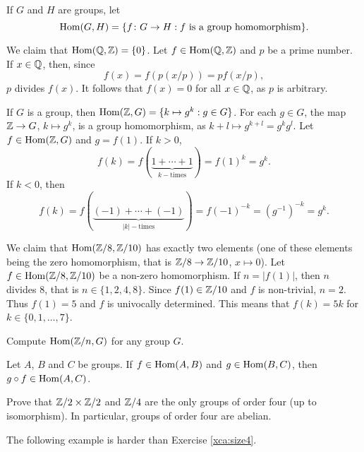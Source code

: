 If $G$ and $H$ are groups, let 
\[
\operatorname{Hom}(G,H)=\{f\colon G\to H:f\text{ is a group homomorphism}\}.
\]

\begin{example}
We claim that 
$\operatorname{Hom}(\mathbb{Q},\mathbb{Z})=\{0\}$. Let $f\in\operatorname{Hom}(\mathbb{Q},\mathbb{Z})$ and $p$ be a prime number. 
If $x\in\mathbb{Q}$, then, since 
\[
f(x)=f\left(p(x/p)\right)=pf(x/p),
\]
$p$ divides $f(x)$. It follows that $f(x)=0$ for all
$x\in\mathbb{Q}$, as $p$ is arbitrary. 
\end{example}

\begin{example}
If $G$ is a group, then $\operatorname{Hom}(\mathbb{Z},G)=\{k\mapsto g^k:g\in G\}$.
For each $g\in G$, the map $\mathbb{Z}\to G$, $k\mapsto g^k$, is a group
homomorphism, as 
$k+l\mapsto g^{k+l}=g^kg^l$. Let $f\in\operatorname{Hom}(\mathbb{Z},G)$ and  $g=f(1)$. If $k>0$,
\[
f(k)=f(\underbrace{1+\cdots+1}_{k-\text{times}})=f(1)^k=g^k.
\]
If $k<0$, then
\[
f(k)=f(\underbrace{(-1)+\cdots+(-1)}_{|k|-\text{times}})=f(-1)^{-k}=(g^{-1})^{-k}=g^k.
\]
\end{example}

\begin{example}
We claim that $\operatorname{Hom}(\mathbb{Z}/8,\mathbb{Z}/10)$ has exactly two elements (one of these elements being 
the zero homomorphism, that is $\mathbb{Z}/8\to\mathbb{Z}/10$, $x\mapsto 0$).
Let $f\in\operatorname{Hom}(\mathbb{Z}/8,\mathbb{Z}/10)$ be a non-zero homomorphism. 
If 
$n=|f(1)|$, then 
$n$ divides $8$, that is $n\in\{1,2,4,8\}$. Since $f(1)\in\mathbb{Z}/10$ and
$f$ is non-trivial,
$n=2$. Thus $f(1)=5$ and $f$ is univocally determined. 
This means that 
$f(k)=5k$ for $k\in\{0,1,\dots,7\}$.
\end{example}

\begin{exercise}
Compute $\operatorname{Hom}(\mathbb{Z}/n,G)$ for any group $G$.
\end{exercise}

\begin{exercise}
Let $A$, $B$ and $C$ be groups. If $f\in\operatorname{Hom}(A,B)$ and $g\in\operatorname{Hom}(B,C)$,
then $g\circ f\in\operatorname{Hom}(A,C)$.
\end{exercise}

\begin{exercise}
\label{xca:size4}
Prove that $\mathbb{Z}/2\times\mathbb{Z}/2$ and $\mathbb{Z}/4$ are 
the only groups of order four (up to isomorphism). In particular, 
groups of order four are abelian. 
\end{exercise}

The following example is harder than
Exercise \ref{xca:size4}.

